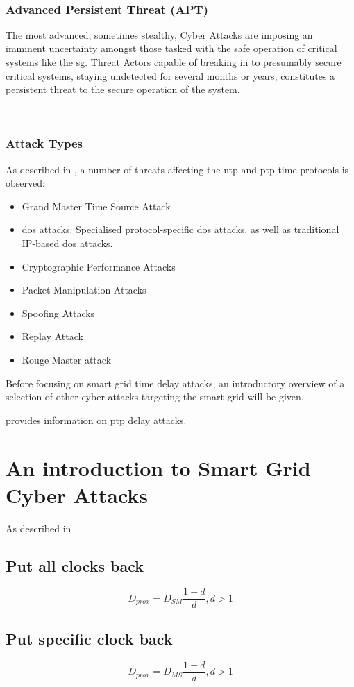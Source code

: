 

\


\subsubsection{Advanced Persistent Threat (APT)}

The most advanced, sometimes stealthy, Cyber Attacks are imposing an imminent uncertainty amongst those tasked with the safe operation of critical systems like the \acrshort{sg}. Threat Actors capable of breaking in to presumably secure critical systems, staying undetected for several months or years, constitutes a persistent threat to the secure operation of the system.


\
\subsubsection{Attack Types}
As described in \cite{ullmann2009delay}, a number of threats affecting the \acrshort{ntp} and  \acrshort{ptp} time protocols is observed:



\begin{itemize}
    \item Grand Master Time Source Attack
    \item \acrfull{dos} attacks: Specialised protocol-specific \acrshort{dos} attacks, as well as traditional IP-based \acrshort{dos} attacks.
    \item Cryptographic Performance Attacks
    \item Packet Manipulation Attacks
    \item Spoofing Attacks
    \item Replay Attack   
    \item Rouge Master attack 
\end{itemize}


Before focusing on smart grid time delay attacks, an introductory overview of a selection of other cyber attacks targeting  the smart grid will be given.


\cite{itkin2017security} provides information on \acrshort{ptp} delay attacks.


\section{An introduction to Smart Grid Cyber Attacks}
As described in \cite{ullmann2009delay}
\subsection{Put all clocks back}

\begin{equation} \label{DSM}
    D_{prox}=D_{SM}\frac{1+d}{d},d>1 
\end{equation}
\subsection{Put specific clock back}
\begin{equation} \label{DMS}
    D_{prox}=D_{MS}\frac{1+d}{d},d>1 
\end{equation}

\cite{finkenzeller2022feasible}